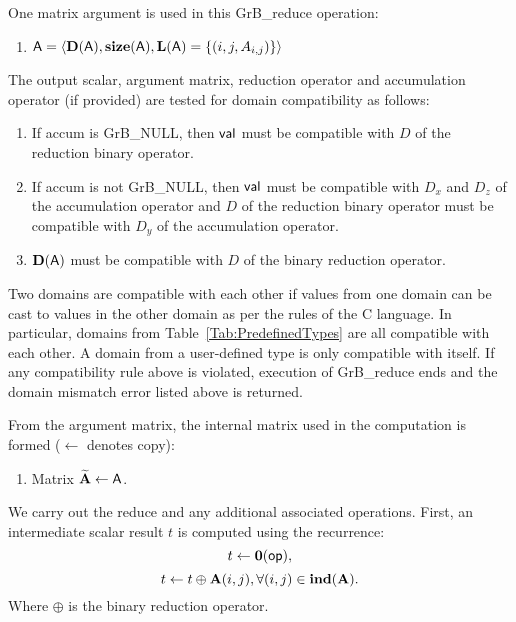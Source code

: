 One matrix argument is used in this {\sf GrB\_reduce} operation:
\begin{enumerate}
	\item ${\sf A} = \langle \bold{D}({\sf A}),\bold{size}({\sf A}),
		\bold{L}({\sf A}) = \{(i,j,A_{i,j}) \} \rangle$

\end{enumerate}

The output scalar, argument matrix, reduction operator and accumulation 
operator (if provided) are tested for domain compatibility as follows:
\begin{enumerate}

	\item If {\sf accum} is {\sf GrB\_NULL}, then ${\sf val}$ must be 
    compatible with $D$ of the reduction binary operator.

	\item If {\sf accum} is not {\sf GrB\_NULL}, then ${\sf val}$ must be
    compatible with $D_x$ and $D_z$ of the accumulation operator and 
    $D$ of the reduction binary operator must be compatible with $D_y$ of the accumulation operator.

	\item $\bold{D}({\sf A})$ must be compatible with $D$ of the binary reduction operator.

\end{enumerate}
Two domains are compatible with each other if values from one domain can be cast 
to values in the other domain as per the rules of the C language.
In particular, domains from Table~\ref{Tab:PredefinedTypes} are all compatible 
with each other. A domain from a user-defined type is only compatible with itself.
If any compatibility rule above is violated, execution of {\sf GrB\_reduce} ends
and the domain mismatch error listed above is returned.

From the argument matrix, the internal matrix used in 
the computation is formed ($\leftarrow$ denotes copy):
\begin{enumerate}
	\item Matrix ${\bf \widetilde{A}} \leftarrow {\sf A}$.
\end{enumerate}

We carry out the reduce and any additional 
associated operations.  
First, an intermediate scalar result $t$ is computed using the recurrence:
\[
	t \leftarrow \bold{0}({\sf op}),
\]
\[
	t \leftarrow t \oplus {\bf A}(i,j), \forall (i,j) \in \bold{ind}({\bf A}). 
\]
Where $\oplus$ is the binary reduction operator.

